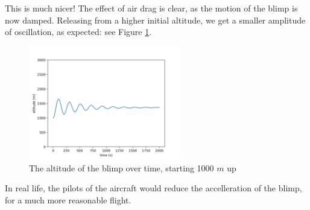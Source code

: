\documentclass[titlepage]{article}
\begin{document}
This is much nicer! The effect of air drag is clear, as the motion of the blimp is now damped. Releasing from a higher initial altitude, we get a smaller amplitude of oscillation, as expected: see Figure \ref{fig:high}.
\begin{figure}[h]
    \centering
    \includegraphics[width=250px]{p2_drag_1000.png}
    \caption{The altitude of the blimp over time, starting 1000 $m$ up}
    \label{fig:high}
\end{figure}
In real life, the pilots of the aircraft would reduce the accelleration of the blimp, for a much more reasonable flight.

\newpage



\thispagestyle{empty}
\end{document}

